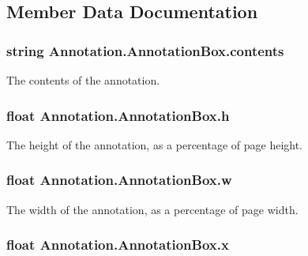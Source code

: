 \subsection{Member Data Documentation}
\subsubsection[{contents}]{\setlength{\rightskip}{0pt plus 5cm}string Annotation.\+Annotation\+Box.\+contents}\label{struct_annotation_1_1_annotation_box_a34dbf8361a6e99dec24a2e34f2235a47}


The contents of the annotation. 

\subsubsection[{h}]{\setlength{\rightskip}{0pt plus 5cm}float Annotation.\+Annotation\+Box.\+h}\label{struct_annotation_1_1_annotation_box_ae1b9fc84cb44650938afc0622f2a73d7}


The height of the annotation, as a percentage of page height. 

\subsubsection[{w}]{\setlength{\rightskip}{0pt plus 5cm}float Annotation.\+Annotation\+Box.\+w}\label{struct_annotation_1_1_annotation_box_a8351fba84fd574b466abdc8922444524}


The width of the annotation, as a percentage of page width. 

\subsubsection[{x}]{\setlength{\rightskip}{0pt plus 5cm}float Annotation.\+Annotation\+Box.\+x}\label{struct_annotation_1_1_annotation_box_a6e431b3be4693eec2a05836305c951b7}


